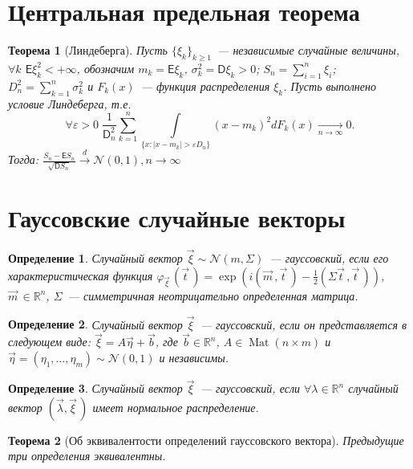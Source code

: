 \documentclass[11pt]{article}
\newtheorem{thm}{Теорема}[section]
\newtheorem{definition}{Определение}
\newcommand{\E}{\mathsf{E}}
\newcommand{\D}{\mathsf{D}}
\newcommand{\N}{\mathcal{N}}
\newcommand{\R}{\mathbb{R}}
\DeclareMathOperator{\Mat}{Mat}
\begin{document}
	\section{Центральная предельная теорема}
	\begin{thm}[Линдеберга]
		Пусть $\{\xi_k\}_{k \geq 1}$~--- независимые случайные величины,
		$\forall k$ $\E\xi_k^2 < +\infty$, обозначим $m_k = \E\xi_k$, $\sigma_k^2 = \D\xi_k > 0$; 
		$S_n = \sum\limits_{i=1}^n \xi_i$; $D_n^2 = \sum\limits_{k=1}^n \sigma_k^2$ и $F_k(x)$~--- 					функция распределения $\xi_k$. Пусть выполнено условие Линдеберга, т.е.
		\[
			\forall\varepsilon > 0\;\frac{1}{\D_n^2}\sum\limits_{k=1}^n\int\limits_{\{x : |x - m_k| > 					\varepsilon D_n\}}(x - m_k)^2 dF_k(x)\underset{n\rightarrow\infty}{\longrightarrow}0.			
		\]  
		Тогда: $\frac{S_n - \E S_n}{\sqrt{\D S_n}}\overset{d}{\rightarrow}\N(0,1), n\rightarrow \infty$	
	\end{thm}
	\section{Гауссовские случайные векторы}
	\begin{definition}
		Случайный вектор $\vec\xi\sim\N(m, \Sigma)$~--- гауссовский, если его характеристическая функция 
		$\varphi_{\vec\xi\,}(\vec t\,) = \exp \left(i(\vec m\, , \vec t\,) - \frac{1}{2}(\Sigma\vec t\, 
		, \vec t\,)\right)$, $\vec m\, \in \R^n$, $\Sigma$~--- симметричная неотрицательно определенная
		матрица.
	\end{definition}	
	\begin{definition}
		Случайный вектор $\vec\xi$~--- гауссовский, если он представляется в следующем виде: 
		$\vec\xi = A\vec\eta + \vec b$, где $\vec b \in \R^n$, $A \in \Mat (n\times m)$ и $\vec\eta = 
		(\eta_1, \dots, \eta_m)\sim\N(0,1)$ и независимы.
	\end{definition}
	\begin{definition}
		Случайный вектор $\vec\xi$~--- гауссовский, если $\forall\lambda\in\R^n$ случайный вектор
		$(\vec\lambda,\vec\xi\,)$ имеет нормальное распределение.
	\end{definition}
	\begin{thm}[Об эквивалентости определений гауссовского вектора]
		Предыдущие три определения эквивалентны.
	\end{thm}
\end{document}
